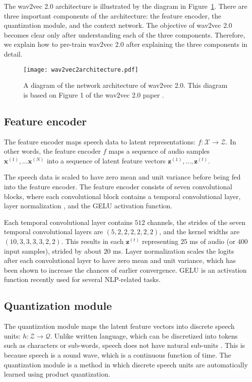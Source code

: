 The wav2vec 2.0 architecture is illustrated by the diagram in Figure~\ref{fig:wav2vec2_architecture}.
There are three important components of the architecture:
the feature encoder, the quantization module, and the context network.
The objective of wav2vec 2.0 becomes clear only after understanding each of the three
components. Therefore, we explain how to pre-train wav2vec 2.0 after explaining
the three components in detail.

\begin{figure}[!ht]
    \centering
    \texttt{[image: wav2vec2architecture.pdf]}
    \caption{A diagram of the network architecture of wav2vec 2.0. This diagram is based on Figure 1 of the wav2vec 2.0 paper \cite{baevski2020wav2vec}.}
    \label{fig:wav2vec2_architecture}

\end{figure}
\subsection{Feature encoder}
The feature encoder maps speech data to latent representations: $f: \mathcal{X} \rightarrow \mathcal{Z}$.
In other words, the feature encoder $f$ maps a sequence of audio samples $\mathbf{x}^{(1)}, \dots \mathbf{x}^{(N)}$ into a sequence of latent feature vectors $\mathbf{z}^{(1)}, \dots, \mathbf{z}^{(t)}$.

The speech data is scaled to have zero mean and unit variance before being fed into the feature encoder. 
The feature encoder consists of seven convolutional blocks, where each convolutional block contains a temporal convolutional layer,
layer normalization \cite{ba2016layer}, and the GELU \cite{hendrycks2016gaussian} activation function.

Each temporal convolutional layer contains $512$ channels, the strides of the seven temporal convolutional layers are $(5,2,2,2,2,2,2)$, and the kernel widths are $(10,3,3,3,3,2,2)$.
This results in each $\mathbf{z}^{(t)}$ representing $25$ ms of audio (or $400$ input samples), strided by about $20$ ms.
Layer normalization scales the logits after each convolutional layer to have zero mean and unit variance, which has been shown to increase the chances of earlier convergence.
GELU is an activation function recently used for several NLP-related tasks.


\subsection{Quantization module}
The quantization module maps the latent feature vectors into discrete speech units: $h: \mathcal{Z} \rightarrow \mathcal{Q}$.
Unlike written language, which can be discretized into tokens such as characters or sub-words, speech does not have natural sub-units \cite{bgn2021illustrated}.
This is because speech is a sound wave, which is a continuous function of time.
The quantization module is a method in which discrete speech units are automatically learned using product quantization.


